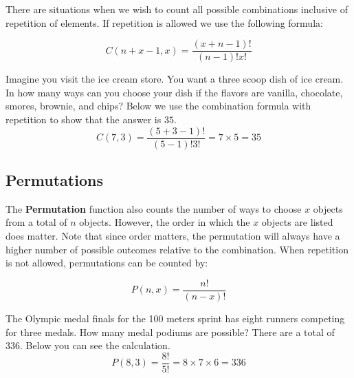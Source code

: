\documentclass[
  11pt,
  letterpaper,
  DIV=11,
  numbers=noendperiod,
  oneside,
  open=any]{scrreprt}
\begin{document}
There are situations when we wish to count all possible combinations
inclusive of repetition of elements. If repetition is allowed we use the
following formula:

\begin{bsformula}

\[C(n+x-1,x)=\frac{(x+n-1)!}{(n-1)!x!}\]

\end{bsformula}

\begin{bsexample}[Example]

Imagine you visit the ice cream store. You want a three scoop dish of
ice cream. In how many ways can you choose your dish if the flavors are
vanilla, chocolate, smores, brownie, and chips? Below we use the
combination formula with repetition to show that the answer is \(35\).
\[C(7,3)=\frac{(5+3-1)!}{(5-1)!3!}= 7 \times 5=35\]

\end{bsexample}

\subsection*{Permutations}\label{permutations}

The \textbf{Permutation} function also counts the number of ways to
choose \(x\) objects from a total of \(n\) objects. However, the order
in which the \(x\) objects are listed does matter. Note that since order
matters, the permutation will always have a higher number of possible
outcomes relative to the combination. When repetition is not allowed,
permutations can be counted by:

\begin{bsformula}

\[P(n,x)= \frac{n!}{(n-x)!}\]

\end{bsformula}

\begin{bsexample}[Example]

The Olympic medal finals for the 100 meters sprint has eight runners
competing for three medals. How many medal podiums are possible? There
are a total of \(336\). Below you can see the calculation.
\[P(8,3)= \frac{8!}{5!}= 8 \times 7 \times 6=336\]

\end{bsexample}
\end{document}
